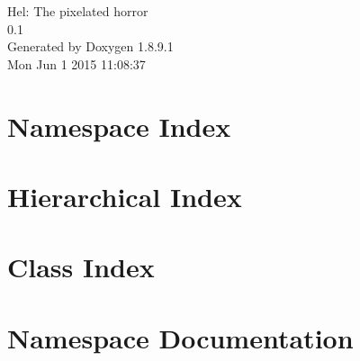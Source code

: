 \documentclass[twoside]{book}
\newcommand{\+}{\discretionary{\mbox{\scriptsize$\hookleftarrow$}}{}{}}
\newcommand{\clearemptydoublepage}{%
  \newpage{\pagestyle{empty}\cleardoublepage}%
}
\begin{document}
\hypersetup{pageanchor=false,
             bookmarks=true,
             bookmarksnumbered=true,
             pdfencoding=unicode
            }
\begin{titlepage}
\vspace*{7cm}
\begin{center}%
{\Large Hel\+: The pixelated horror \\[1ex]\large 0.\+1 }\\
\vspace*{1cm}
{\large Generated by Doxygen 1.8.9.1}\\
\vspace*{0.5cm}
{\small Mon Jun 1 2015 11:08:37}\\
\end{center}
\end{titlepage}
\clearemptydoublepage
\tableofcontents
\clearemptydoublepage
{}
\hypersetup{pageanchor=true}

\chapter{Namespace Index}

\chapter{Hierarchical Index}

\chapter{Class Index}

\chapter{Namespace Documentation}












\end{document}

